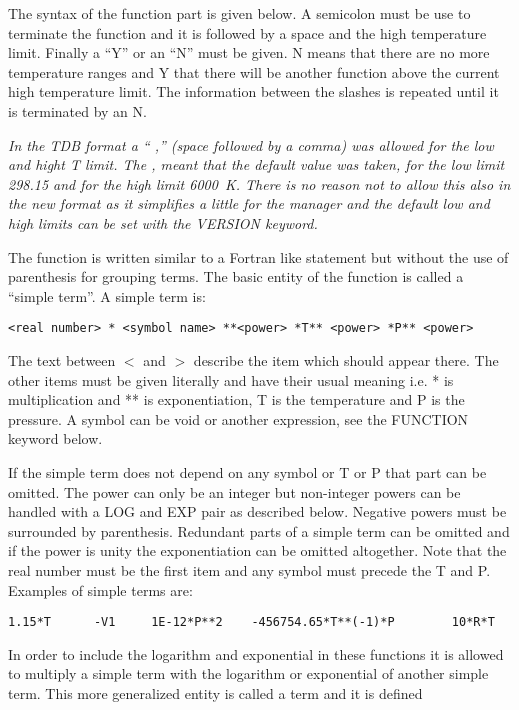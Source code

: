 \documentclass[12pt]{article}
\begin{document}
The syntax of the function part is given below.  A semicolon must be
use to terminate the function and it is followed by a space and the
high temperature limit.  Finally a ``Y'' or an ``N'' must be given.  N
means that there are no more temperature ranges and Y that there will
be another function above the current high temperature limit.  The
information between the slashes is repeated until it is terminated by
an N.

{\em In the TDB format a `` ,'' (space followed by a comma) was
  allowed for the low and hight T limit.  The , meant that the default
  value was taken, for the low limit 298.15 and for the high limit
  6000~K.  There is no reason not to allow this also in the new format
  as it simplifies a little for the manager and the default low and
  high limits can be set with the VERSION keyword.}

The function is written similar to a Fortran like statement but
without the use of parenthesis for grouping terms.  The basic entity of
the function is called a ``simple term''.  A simple term is:

\begin{verbatim}
<real number> * <symbol name> **<power> *T** <power> *P** <power>
\end{verbatim}

The text between $<$ and $>$ describe the item which should appear
there.  The other items must be given literally and have their usual
meaning i.e.  * is multiplication and ** is exponentiation, T is the
temperature and P is the pressure.  A symbol can be void or another
expression, see the FUNCTION keyword below.

If the simple term does not depend on any symbol or T or P that part
can be omitted.  The power can only be an integer but non-integer powers
can be handled with a LOG and EXP pair as described below.  Negative
powers must be surrounded by parenthesis.  Redundant parts of a simple
term can be omitted and if the power is unity the exponentiation can
be omitted altogether.  Note that the real number must be the first
item and any symbol must precede the T and P.  Examples of simple terms
are:

\begin{verbatim}
1.15*T      -V1     1E-12*P**2    -456754.65*T**(-1)*P        10*R*T
\end{verbatim}

In order to include the logarithm and exponential in these functions
it is allowed to multiply a simple term with the logarithm or       
exponential of another simple term.  This more generalized entity is 
called a term and it is defined
\end{document}
